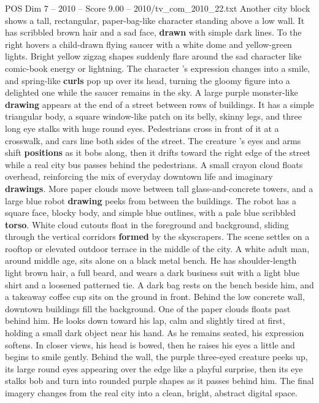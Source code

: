\begin{textsample}{POS Dim 7 – 2010 – Score 9.00 – 2010/tv\_com\_2010\_22.txt}
Another city block shows a tall, rectangular, paper-bag-like character standing above a low wall.
It has scribbled brown hair and a sad face, \textbf{drawn} with simple dark lines.
To the right hovers a child-drawn flying saucer with a white dome and yellow-green lights.
Bright yellow zigzag shapes suddenly flare around the sad character like comic-book energy or lightning.
The character ’s expression changes into a smile, and spring-like \textbf{curls} pop up over its head, turning the gloomy figure into a delighted one while the saucer remains in the sky.
A large purple monster-like \textbf{drawing} appears at the end of a street between rows of buildings.
It has a simple triangular body, a square window-like patch on its belly, skinny legs, and three long eye stalks with huge round eyes.
Pedestrians cross in front of it at a crosswalk, and cars line both sides of the street.
The creature ’s eyes and arms shift \textbf{positions} as it bobs along, then it drifts toward the right edge of the street while a real city bus passes behind the pedestrians.
A small crayon cloud floats overhead, reinforcing the mix of everyday downtown life and imaginary \textbf{drawings}.
More paper clouds move between tall glass-and-concrete towers, and a large blue robot \textbf{drawing} peeks from between the buildings.
The robot has a square face, blocky body, and simple blue outlines, with a pale blue scribbled \textbf{torso}.
White cloud cutouts float in the foreground and background, sliding through the vertical corridors \textbf{formed} by the skyscrapers.
The scene settles on a rooftop or elevated outdoor terrace in the middle of the city.
A white adult man, around middle age, sits alone on a black metal bench.
He has shoulder-length light brown hair, a full beard, and wears a dark business suit with a light blue shirt and a loosened patterned tie.
A dark bag rests on the bench beside him, and a takeaway coffee cup sits on the ground in front.
Behind the low concrete wall, downtown buildings fill the background.
One of the paper clouds floats past behind him.
He looks down toward his lap, calm and slightly tired at first, holding a small dark object near his hand.
As he remains seated, his expression softens.
In closer views, his head is bowed, then he raises his eyes a little and begins to smile gently.
Behind the wall, the purple three-eyed creature peeks up, its large round eyes appearing over the edge like a playful surprise, then its eye stalks bob and turn into rounded purple shapes as it passes behind him.
The final imagery changes from the real city into a clean, bright, abstract digital space.

\end{textsample}
